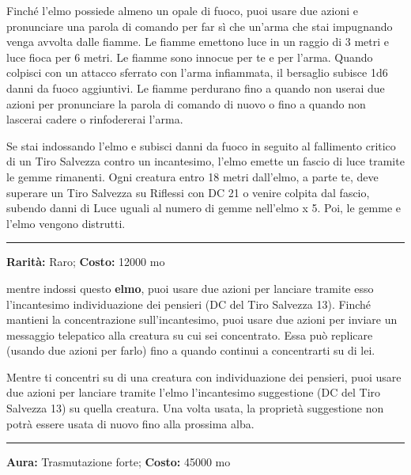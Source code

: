 \begin{multicols}{2}
Finché l'elmo possiede almeno un opale di fuoco, puoi usare due azioni e pronunciare una parola di comando per far sì che un'arma che stai impugnando venga avvolta dalle fiamme. Le fiamme emettono luce in un raggio di 3 metri e luce fioca per 6 metri. Le fiamme sono innocue per te e per l'arma. Quando colpisci con un attacco sferrato con l'arma infiammata, il bersaglio subisce 1d6 danni da fuoco aggiuntivi. Le fiamme perdurano fino a quando non userai due azioni per pronunciare la parola di comando di nuovo o fino a quando non lascerai cadere o rinfodererai l'arma.

Se stai indossando l'elmo e subisci danni da fuoco in seguito al fallimento critico di un Tiro Salvezza contro un incantesimo, l'elmo emette un fascio di luce tramite le gemme rimanenti. Ogni creatura entro 18 metri dall'elmo, a parte te, deve superare un Tiro Salvezza su Riflessi con DC 21 o venire colpita dal fascio, subendo danni di Luce uguali al numero di gemme nell'elmo x 5. Poi, le gemme e l'elmo vengono distrutti.

\smallskip\noindent\rule{\linewidth}{2pt}  \hypertarget{ElmodellaTelepatia}{}\medskip{}\noindent\label{ElmodellaTelepatia}

\textbf{Rarità:} Raro; \textbf{Costo:} 12000 mo

mentre indossi questo \textbf{elmo}, puoi usare due azioni per lanciare tramite esso l'incantesimo individuazione dei pensieri (DC del Tiro Salvezza 13). Finché mantieni la concentrazione sull'incantesimo, puoi usare due azioni per inviare un messaggio telepatico alla creatura su cui sei concentrato. Essa può replicare (usando due azioni per farlo) fino a quando continui a concentrarti su di lei.

Mentre ti concentri su di una creatura con individuazione dei pensieri, puoi usare due azioni per lanciare tramite l'elmo l'incantesimo suggestione (DC del Tiro Salvezza 13) su quella creatura. Una volta usata, la proprietà suggestione non potrà essere usata di nuovo fino alla prossima alba.

\smallskip\noindent\rule{\linewidth}{2pt}  \hypertarget{EnergiaLuminosa}{}\medskip{}\noindent\label{EnergiaLuminosa}

\textbf{Aura:} Trasmutazione forte; \textbf{Costo:} 45000 mo


\end{multicols}
